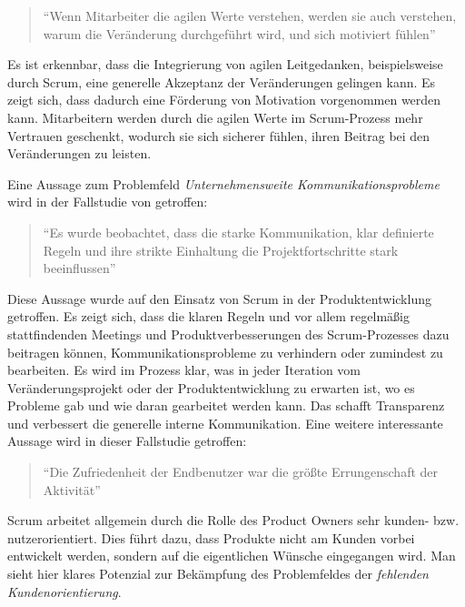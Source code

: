 \begin{quote}
	``Wenn Mitarbeiter die agilen Werte verstehen, werden sie auch verstehen, warum die Veränderung durchgeführt wird, und sich motiviert fühlen'' \cite[S. 17]{dikert_challenges_2016}
\end{quote}

Es ist erkennbar, dass die Integrierung von agilen Leitgedanken, beispielsweise durch Scrum, eine generelle Akzeptanz der Veränderungen gelingen kann. Es zeigt sich, dass dadurch eine Förderung von Motivation vorgenommen werden kann. Mitarbeitern werden durch die agilen Werte im Scrum-Prozess mehr Vertrauen geschenkt, wodurch sie sich sicherer fühlen, ihren Beitrag bei den Veränderungen zu leisten.

Eine Aussage zum Problemfeld \textit{Unternehmensweite Kommunikationsprobleme} wird in der Fallstudie von  getroffen:

\begin{quote}
	``Es wurde beobachtet, dass die starke Kommunikation, klar definierte Regeln und ihre strikte Einhaltung die Projektfortschritte stark beeinflussen'' \cite[S. 4]{alawairdhi_agile_2016}
\end{quote}

Diese Aussage wurde auf den Einsatz von Scrum in der Produktentwicklung getroffen. Es zeigt sich, dass die klaren Regeln und vor allem regelmäßig stattfindenden Meetings und Produktverbesserungen des Scrum-Prozesses dazu beitragen können, Kommunikationsprobleme zu verhindern oder zumindest zu bearbeiten. Es wird im Prozess klar, was in jeder Iteration vom Veränderungsprojekt oder der Produktentwicklung zu erwarten ist, wo es Probleme gab und wie daran gearbeitet werden kann. Das schafft Transparenz und verbessert die generelle interne Kommunikation. Eine weitere interessante Aussage wird in dieser Fallstudie getroffen:

\begin{quote}
	``Die Zufriedenheit der Endbenutzer war die größte Errungenschaft der Aktivität'' \cite[S. 4]{alawairdhi_agile_2016}
\end{quote}

Scrum arbeitet allgemein durch die Rolle des Product Owners sehr kunden- bzw. nutzerorientiert. Dies führt dazu, dass Produkte nicht am Kunden vorbei entwickelt  werden, sondern auf die eigentlichen Wünsche eingegangen wird. Man sieht hier klares Potenzial  zur Bekämpfung des  Problemfeldes der \textit{fehlenden Kundenorientierung}.

